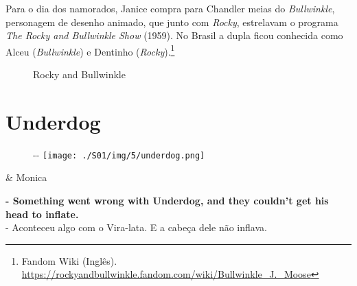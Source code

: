 \saveparinfos
\noindent
\begin{minipage}[c]{0.5\textwidth}\useparinfo

Para o dia dos namorados, Janice compra para Chandler meias do
\emph{Bullwinkle}, personagem de desenho animado, que junto com
\emph{Rocky}, estrelavam o programa \emph{The Rocky and Bullwinkle Show}
(1959). No Brasil a dupla ficou conhecida como Alceu (\emph{Bullwinkle})
e Dentinho (\emph{Rocky}).\footnote{\sloppy Fandom Wiki (Inglês). \url{https://rockyandbullwinkle.fandom.com/wiki/Bullwinkle_J._Moose}}

\end{minipage}\hfill
\begin{minipage}[c]{0.5\textwidth}

\begin{figure}
  \centering
    \caption{Rocky and Bullwinkle\label{fig:rocky-and-bullwinkle}}
\end{figure}

\end{minipage}

\hypertarget{underdog}{%
\section{Underdog}\label{underdog}}

\begin{figure}[!ht]
  \begin{adjustwidth}{-\oddsidemargin-1in}{-\rightmargin}
    \centering
    \texttt{[image: ./S01/img/5/underdog.png]}
  \end{adjustwidth}
\end{figure}

\begin{tcolorbox}[enhanced,center upper,
    drop fuzzy shadow southeast, boxrule=0.3pt,
    lower separated=false,
    colframe=black!30!dialogoBorder,colback=white]
\begin{minipage}[c]{0.16\linewidth}
   & \centering \scriptsize{Monica}
\end{minipage}
\hfill
\begin{minipage}[c]{0.8\linewidth}
  \textbf{- Something went wrong with Underdog, and they couldn't get his head to inflate.}\\
  - Aconteceu algo com o Vira-lata. E a cabeça dele não inflava.
\end{minipage}
\end{tcolorbox}

